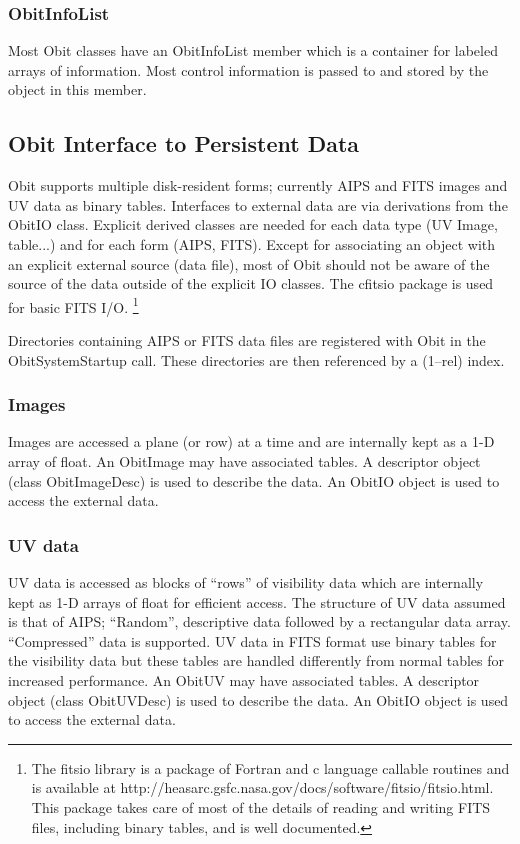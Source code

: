 \documentclass[11pt]{article}
\begin{document}
\subsubsection{ObitInfoList}
Most Obit classes have an ObitInfoList member which is a container for
labeled arrays of information.
Most control information is passed to and stored by the object in this
member.

\subsection{Obit Interface to Persistent Data}
Obit supports multiple disk-resident forms; currently AIPS and FITS
images and UV data as binary tables.
Interfaces to external data are via derivations from the ObitIO
class.
Explicit derived classes are needed for each data type (UV Image,
table...) and for each form (AIPS, FITS).
Except for associating an object with an explicit external source (data
file), most of Obit should not be aware of the source of the data
outside of the explicit IO classes.
The cfitsio package is used for basic FITS I/O.
\footnote{The fitsio library is a package of Fortran and c language
callable routines and is available at 
http://heasarc.gsfc.nasa.gov/docs/software/fitsio/fitsio.html.
This package takes care of most of the details of reading and writing
FITS files, including binary tables, and is well documented.}

Directories containing AIPS or FITS data files are registered with
Obit in the ObitSystemStartup call.
These directories are then referenced by a (1--rel) index.

\subsubsection{Images}
Images are accessed a plane (or row) at a time and are internally
kept as a 1-D array of float.
An ObitImage may have associated tables.
A descriptor object (class ObitImageDesc) is used to describe the data.
An ObitIO object is used to access the external data.

\subsubsection{UV data}
UV data is accessed as blocks of ``rows'' of visibility data which are
internally kept as 1-D arrays of float for efficient access.
The structure of UV data assumed is that of AIPS; ``Random'',
descriptive data followed by a rectangular data array.
``Compressed'' data is supported.
UV data in FITS format use binary tables for the visibility data but
these tables are handled differently from normal tables for increased
performance.
An ObitUV may have associated tables.
A descriptor object (class ObitUVDesc) is used to describe the data.
An ObitIO object is used to access the external data.
\end{document}
